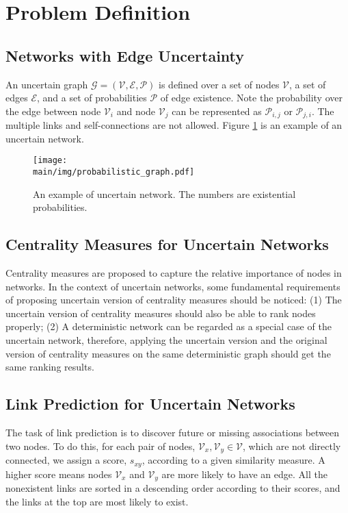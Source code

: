 \documentclass[\main/thesis.tex]{subfiles}
\begin{document}
\section{Problem Definition}
\subsection{Networks with Edge Uncertainty} \label{Uncertain-Network-Definition}
An uncertain graph $\mathcal{G = (V,E,P)}$ is defined over a set of nodes $\mathcal{V}$, a set of edges $\mathcal{E}$, and a set of probabilities $\mathcal{P}$ of edge existence. Note the probability over the edge between node $\mathcal{V}_i$ and node $\mathcal{V}_j$ can be represented as $\mathcal{P}_{i,j}$ or $\mathcal{P}_{j,i}$. The multiple links and self-connections are not allowed. Figure \ref{uncertain_network_example} is an example of an uncertain network.
\begin{figure}
\centering
\texttt{[image: \\main/img/probabilistic\_graph.pdf]}
\caption{An example of uncertain network. The numbers are existential probabilities.}
\label{uncertain_network_example}
\end{figure}

\subsection{Centrality Measures for Uncertain Networks}
Centrality measures are proposed to capture the relative importance of nodes in networks. In the context of uncertain networks, some fundamental requirements of proposing uncertain version of centrality measures should be noticed: (1) The uncertain version of centrality measures should also be able to rank nodes properly; (2) A deterministic network can be regarded as a special case of the uncertain network, therefore, applying the uncertain version and the original version of centrality measures on the same deterministic graph should get the same ranking results.

\subsection{Link Prediction for Uncertain Networks}
The task of link prediction is to discover future or missing associations between two nodes. To do this, for each pair of nodes, $\mathcal{V}_x,\mathcal{V}_y\in \mathcal{V}$, which are not directly connected, we assign a score, $s_{xy}$, according to a given similarity measure. A higher score means nodes $\mathcal{V}_x$ and $\mathcal{V}_y$ are more likely to have an edge. All the nonexistent links are sorted in a descending order according to their scores, and the links at the top are most likely to exist.
\end{document}
